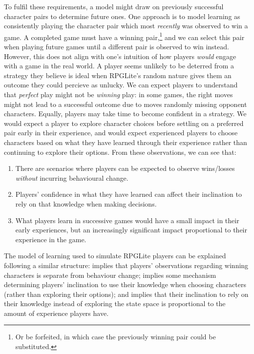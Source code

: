 To fulfil these requirements, a model might draw on previously successful
character pairs to determine future ones. One approach is to model learning as
consistently playing the character pair which most \emph{recently} was observed
to win a game. A completed game must have a winning pair,\footnote{Or be
forfeited, in which case the previously winning pair could be substituted.} and
we can select this pair when playing future games until a different pair is
observed to win instead. However, this does not align with one's intuition of
how players \emph{would} engage with a game in the real world. A player seems
unlikely to be deterred from a strategy they believe is ideal when RPGLite's
random nature gives them an outcome they could percieve as unlucky. We can
expect players to understand that \emph{perfect} play might not be
\emph{winning} play: in some games, the right moves might not lead to a
successful outcome due to moves randomly missing opponent characters. Equally,
players may take time to become confident in a strategy. We would expect a
player to explore character choices before settling on a preferred pair early in
their experience, and would expect experienced players to choose characters
based on what they have learned through their experience rather
than continuing to explore their options. From these observations, we can see that:

\begin{enumerate}
  \item There are scenarios where players can be expected to observe wins/losses
  \emph{without} incurring behavioural change.
  \item Players' confidence in what they have learned can affect their
  inclination to rely on that knowledge when making decisions.
  \item What players learn in successive games would have a small impact in
  their early experiences, but an increasingly significant impact proportional
  to their experience in the game.
\end{enumerate}

The model of learning used to simulate RPGLite players can be explained
following a similar structure:  implies that players' observations
regarding winning characters is separate from behaviour change;  implies
some mechanism determining players' inclination to use their knowledge when choosing
characters (rather than exploring their options); and  implies that
their inclination to rely on their knowledge instead of exploring the state
space is proportional to the amount of experience players have.

